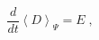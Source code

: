 \begin{equation}
\frac{d}{dt}
\left\langle
D
\right\rangle_{\scriptstyle \!  \Psi}
= 
E
\;  ,
\label{eq:anomaly_2D_ISP_circular_well}
\end{equation}

